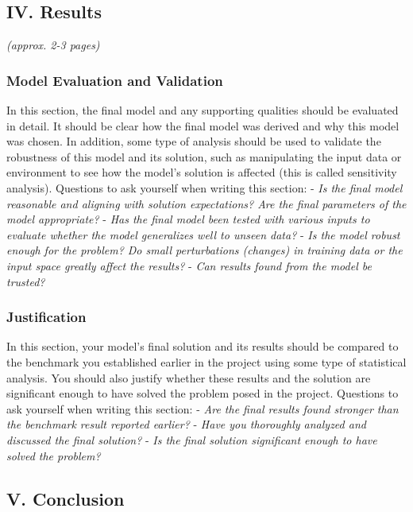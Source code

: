\documentclass[]{article}
\begin{document}
\subsection{IV. Results}\label{iv.-results}

\emph{(approx. 2-3 pages)}

\subsubsection{Model Evaluation and
Validation}\label{model-evaluation-and-validation}

In this section, the final model and any supporting qualities should be evaluated in detail. It should be clear how the final model was derived and why this model was chosen. In addition, some type of analysis should be used to validate the robustness of this model and its solution, such as manipulating the input data or environment to see how the model's solution is affected (this is called sensitivity analysis). Questions to ask yourself when writing this section: - \emph{Is the final model reasonable and aligning with solution expectations? Are the final parameters of the model appropriate?} - \emph{Has the final model been tested with various inputs to evaluate whether the model generalizes well to unseen data?} - \emph{Is the model robust enough for the problem? Do small perturbations (changes) in training data or the input space greatly affect the results?} - \emph{Can results found from the model be trusted?}

\subsubsection{Justification}\label{justification}

In this section, your model's final solution and its results should be compared to the benchmark you established earlier in the project using some type of statistical analysis. You should also justify whether these results and the solution are significant enough to have solved the problem posed in the project. Questions to ask yourself when writing this section: - \emph{Are the final results found stronger than the benchmark result reported earlier?} - \emph{Have you thoroughly analyzed and discussed the final solution?} - \emph{Is the final solution significant enough to have solved the problem?}

\subsection{V. Conclusion}\label{v.-conclusion}
\end{document}
